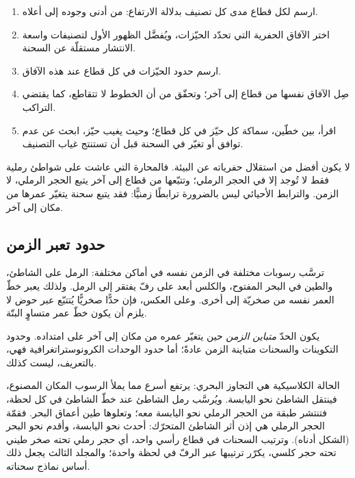 \begin{method}\label{met:b1:stratigraphic-scale:biozones}
\begin{enumerate}
  \item ارسم لكل قطاع مدى كل تصنيف بدلالة الارتفاع: من أدنى وجوده إلى أعلاه.
  \item اختر الآفاق الحفرية التي تحدّد الحيّزات، ويُفضَّل الظهور الأول لتصنيفات واسعة الانتشار مستقلّة عن السحنة.
  \item ارسم حدود الحيّزات في كل قطاع عند هذه الآفاق.
  \item صِل الآفاق نفسها من قطاع إلى آخر؛ وتحقّق من أن الخطوط لا تتقاطع، كما يقتضي التراكب.
  \item اقرأ، بين خطّين، سماكة كل حيّز في كل قطاع؛ وحيث يغيب حيّز، ابحث عن عدم توافق أو تغيّر في السحنة قبل أن تستنتج غياب التصنيف.
\end{enumerate}
\end{method}

 لا يكون أفضل من استقلال حفرياته عن البيئة. فالمحارة التي عاشت على شواطئ رملية فقط لا تُوجد إلا في الحجر الرملي؛ وتتبّعها من قطاع إلى آخر يتبع الحجر الرملي، لا الزمن. والترابط الأحيائي ليس بالضرورة ترابطًا زمنيًّا: فقد يتبع سحنة يتغيّر عمرها من مكان إلى آخر.

\subsection*{حدود تعبر الزمن}

ترسَّب رسوبات مختلفة في الزمن نفسه في أماكن مختلفة: الرمل على الشاطئ، والطين في البحر المفتوح، والكلس أبعد على رفّ يفتقر إلى الرمل. ولذلك يعبر خطّ العمر نفسه من صخريّة إلى أخرى. وعلى العكس، فإن حدًّا صخريًّا يُتتبّع عبر حوض لا يلزم أن يكون خطّ عمر متساوٍ البتّة.

\begin{definition}\label{def:b1:stratigraphic-scale:diachronous}
يكون الحدّ \emph{متباين الزمن} حين يتغيّر عمره من مكان إلى آخر على امتداده. وحدود التكوينات والسحنات متباينة الزمن عادةً؛ أما حدود الوحدات الكرونوستراتغرافية فهي، بالتعريف، ليست كذلك.
\end{definition}

الحالة الكلاسيكية هي التجاوز البحري: يرتفع  أسرع مما يملأ الرسوب المكان المصنوع، فينتقل الشاطئ نحو اليابسة. ويُرسَّب رمل الشاطئ عند خطّ الشاطئ في كل لحظة، فتنتشر طبقة من الحجر الرملي نحو اليابسة معه؛ وتعلوها طين أعماق البحر. فقمّة الحجر الرملي هي إذن أثر الشاطئ المتحرّك: أحدث نحو اليابسة، وأقدم نحو البحر (الشكل أدناه). وترتيب السحنات في قطاع رأسي واحد، أي حجر رملي تحته صخر طيني تحته حجر كلسي، يكرّر ترتيبها عبر الرفّ في لحظة واحدة؛ والمجلد الثالث يجعل ذلك أساس نماذج سحناته.

